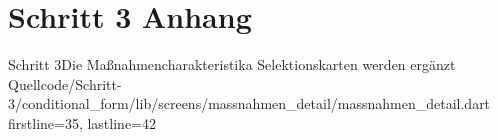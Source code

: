 \section{Schritt 3 Anhang} 
\label{appendix:Schritt3Anhang}

\begin{alexlisting}{Schritt 3}{Die Maßnahmencharakteristika Selektionskarten werden ergänzt}
    {Quellcode/Schritt-3/conditional_form/lib/screens/massnahmen_detail/massnahmen_detail.dart}
    {firstline=35, lastline=42}
    \label{lst:Schritt3saveRecord}
\end{alexlisting}